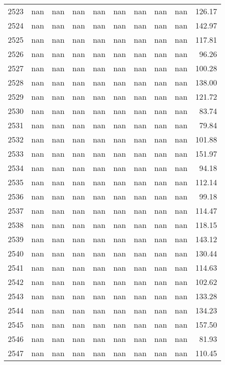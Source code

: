 \begin{tabular}{lrrrrrrrrr}
2523 & nan & nan & nan & nan & nan & nan & nan & nan & 126.17 \\
2524 & nan & nan & nan & nan & nan & nan & nan & nan & 142.97 \\
2525 & nan & nan & nan & nan & nan & nan & nan & nan & 117.81 \\
2526 & nan & nan & nan & nan & nan & nan & nan & nan & 96.26 \\
2527 & nan & nan & nan & nan & nan & nan & nan & nan & 100.28 \\
2528 & nan & nan & nan & nan & nan & nan & nan & nan & 138.00 \\
2529 & nan & nan & nan & nan & nan & nan & nan & nan & 121.72 \\
2530 & nan & nan & nan & nan & nan & nan & nan & nan & 83.74 \\
2531 & nan & nan & nan & nan & nan & nan & nan & nan & 79.84 \\
2532 & nan & nan & nan & nan & nan & nan & nan & nan & 101.88 \\
2533 & nan & nan & nan & nan & nan & nan & nan & nan & 151.97 \\
2534 & nan & nan & nan & nan & nan & nan & nan & nan & 94.18 \\
2535 & nan & nan & nan & nan & nan & nan & nan & nan & 112.14 \\
2536 & nan & nan & nan & nan & nan & nan & nan & nan & 99.18 \\
2537 & nan & nan & nan & nan & nan & nan & nan & nan & 114.47 \\
2538 & nan & nan & nan & nan & nan & nan & nan & nan & 118.15 \\
2539 & nan & nan & nan & nan & nan & nan & nan & nan & 143.12 \\
2540 & nan & nan & nan & nan & nan & nan & nan & nan & 130.44 \\
2541 & nan & nan & nan & nan & nan & nan & nan & nan & 114.63 \\
2542 & nan & nan & nan & nan & nan & nan & nan & nan & 102.62 \\
2543 & nan & nan & nan & nan & nan & nan & nan & nan & 133.28 \\
2544 & nan & nan & nan & nan & nan & nan & nan & nan & 134.23 \\
2545 & nan & nan & nan & nan & nan & nan & nan & nan & 157.50 \\
2546 & nan & nan & nan & nan & nan & nan & nan & nan & 81.93 \\
2547 & nan & nan & nan & nan & nan & nan & nan & nan & 110.45 \\

\end{tabular}
